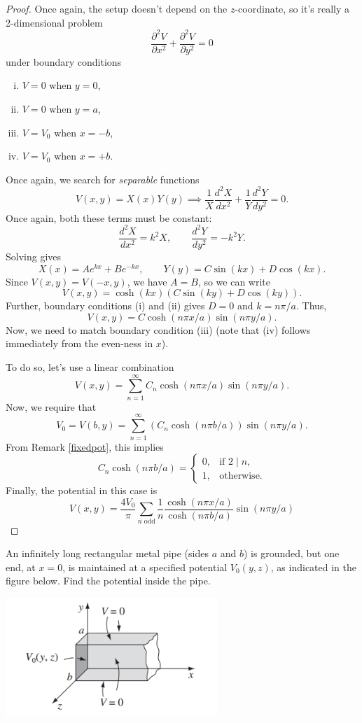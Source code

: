 \begin{proof}
Once again, the setup doesn't depend on the $z$-coordinate, so it's really a 2-dimensional problem
\[\frac{\partial^2V}{\partial x^2}+\frac{\partial^2V}{\partial y^2}=0\]
under boundary conditions
\begin{enumerate}[(i)]
    \item $V=0$ when $y=0$,
    \item $V=0$ when $y=a$,
    \item $V=V_0$ when $x=-b$,
    \item $V=V_0$ when $x=+b$.
\end{enumerate}
Once again, we search for \textit{separable} functions
\[V(x,y)=X(x)Y(y)\implies \frac{1}{X}\frac{d^2X}{dx^2}+\frac{1}{Y}\frac{d^2Y}{dy^2}=0.\]
Once again, both these terms must be constant:
\[\frac{d^2X}{dx^2}=k^2X, \qquad \frac{d^2Y}{dy^2}=-k^2Y.\]
Solving gives
\[X(x)=Ae^{kx}+Be^{-kx}, \qquad Y(y)=C\sin(kx)+D\cos(kx).\]
Since $V(x,y)=V(-x,y)$, we have $A=B$, so we can write
\[V(x,y)=\cosh (kx)(C\sin (ky)+D\cos (ky)).\]
Further, boundary conditions (i) and (ii) gives $D=0$ and $k=n\pi /a$. Thus,
\[V(x,y)=C\cosh(n\pi x/a)\sin(n\pi y/a).\]
Now, we need to match boundary condition (iii) (note that (iv) follows immediately from the even-ness in $x$).

To do so, let's use a linear combination
\[V(x,y)=\sum_{n=1}^\infty C_n
\cosh(n\pi x/a)\sin(n\pi y/a).\]
Now, we require that
\[V_0=V(b,y)=\sum_{n=1}^\infty \left(C_n\cosh (n\pi b/a)\right)\sin(n\pi y/a).\]
From Remark \ref{fixedpot}, this implies
\[C_n\cosh(n\pi b/a)=\begin{cases}
0, & \text{if }2\mid n,\\
1, & \text{otherwise}.
\end{cases}\]
Finally, the potential in this case is
\[\boxed{V(x,y)=\frac{4V_0}{\pi}\sum_{n\text{ odd}}\frac{1}{n}\frac{\cosh(n\pi x/a)}{\cosh(n\pi b/a)}\sin(n\pi y/a)}\]
\end{proof}

\begin{example}
An infinitely long rectangular metal pipe (sides $a$ and $b$) is grounded, but one end, at $x = 0$, is maintained at a specified potential $V_0(y,z)$, as indicated in the figure below. Find the potential inside the pipe.
\end{example}

\begin{center}
    \includegraphics[width=8cm]{Electrodynamics/images/fig3.22.PNG}
\end{center}

